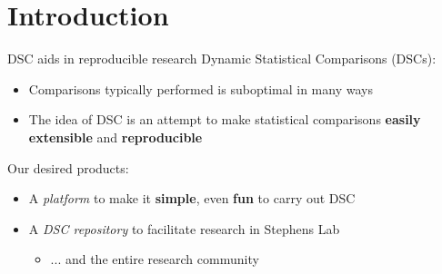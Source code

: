 
\section{Introduction}
\begin{frame}{DSC aids in reproducible research}
  Dynamic Statistical Comparisons (DSCs):
\begin{itemize}
\item Comparisons typically performed is suboptimal in many ways
\item The idea of DSC is an attempt to make statistical comparisons
  \textbf{easily extensible} and \textbf{reproducible}
\end{itemize}
\bigskip
Our desired products: 
\begin{itemize}
\pause \item A \textit{platform} to make it \textbf{simple}, even \textbf{fun} to carry out DSC
\item A \textit{DSC repository} to facilitate research in Stephens Lab
\begin{itemize}
  \item ... and the entire research community
\end{itemize}
\end{itemize}
\end{frame}

